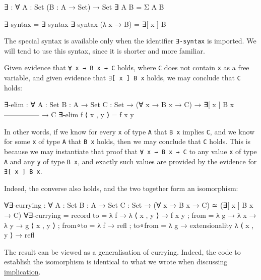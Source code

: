 \begin{fence}
\begin{code}
∃ : ∀ {A : Set} (B : A → Set) → Set
∃ {A} B = Σ A B

∃-syntax = ∃
syntax ∃-syntax (λ x → B) = ∃[ x ] B
\end{code}
\end{fence}

The special syntax is available only when the identifier
\texttt{∃-syntax} is imported. We will tend to use this syntax, since it
is shorter and more familiar.

Given evidence that \texttt{∀\ x\ →\ B\ x\ →\ C} holds, where \texttt{C}
does not contain \texttt{x} as a free variable, and given evidence that
\texttt{∃{[}\ x\ {]}\ B\ x} holds, we may conclude that \texttt{C}
holds:

\begin{fence}
\begin{code}
∃-elim : ∀ {A : Set} {B : A → Set} {C : Set}
  → (∀ x → B x → C)
  → ∃[ x ] B x
    ---------------
  → C
∃-elim f ⟨ x , y ⟩ = f x y
\end{code}
\end{fence}

In other words, if we know for every \texttt{x} of type \texttt{A} that
\texttt{B\ x} implies \texttt{C}, and we know for some \texttt{x} of
type \texttt{A} that \texttt{B\ x} holds, then we may conclude that
\texttt{C} holds. This is because we may instantiate that proof that
\texttt{∀\ x\ →\ B\ x\ →\ C} to any value \texttt{x} of type \texttt{A}
and any \texttt{y} of type \texttt{B\ x}, and exactly such values are
provided by the evidence for \texttt{∃{[}\ x\ {]}\ B\ x}.

Indeed, the converse also holds, and the two together form an
isomorphism:

\begin{fence}
\begin{code}
∀∃-currying : ∀ {A : Set} {B : A → Set} {C : Set}
  → (∀ x → B x → C) ≃ (∃[ x ] B x → C)
∀∃-currying =
  record
    { to      =  λ{ f → λ{ ⟨ x , y ⟩ → f x y }}
    ; from    =  λ{ g → λ{ x → λ{ y → g ⟨ x , y ⟩ }}}
    ; from∘to =  λ{ f → refl }
    ; to∘from =  λ{ g → extensionality λ{ ⟨ x , y ⟩ → refl }}
    }
\end{code}
\end{fence}

The result can be viewed as a generalisation of currying. Indeed, the
code to establish the isomorphism is identical to what we wrote when
discussing \protect\hyperlink{Connectives-implication}{implication}.

